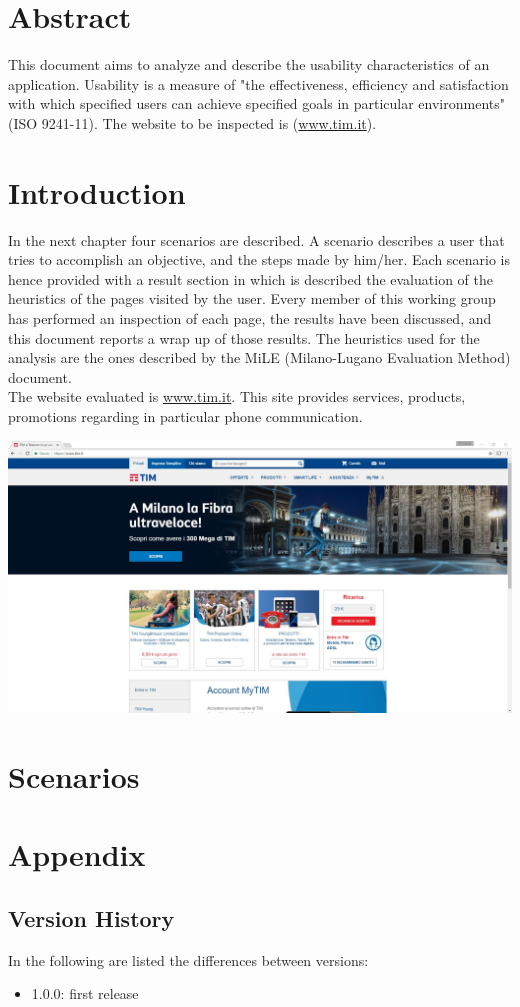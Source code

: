 \documentclass{../Common/Structure/doc_pdf}
\begin{document}
\titleToc

\chapter{Abstract}
This document aims to analyze and describe the usability characteristics of an application. Usability is a measure of "the effectiveness, efficiency and satisfaction with which specified users can achieve specified goals in particular environments" (ISO 9241-11).
The website to be inspected is (\url{www.tim.it}).

\chapter{Introduction}
In the next chapter four scenarios are described. A scenario describes a user that tries to accomplish an objective, and the steps made by him/her. Each scenario is hence provided with a result section in which is described the evaluation of the heuristics of the pages visited by the user. Every member of this working group has performed an inspection of each page, the results have been discussed, and this document reports a wrap up of those results. The heuristics used for the analysis are the ones described by the MiLE (Milano-Lugano Evaluation Method) document.\\
The website evaluated is \url{www.tim.it}. This site provides services, products, promotions regarding in particular phone communication.
\vspace{1cm}
\begin{center}
	\includegraphics[width=\textwidth]{Screenshot/homepage.jpg}
\end{center}


\chapter{Scenarios}





\appendix
\chapter{Appendix}
\section{Version History}
In the following are listed the differences between versions:
\begin{itemize}
	\item 1.0.0: first release
\end{itemize}
\end{document}
